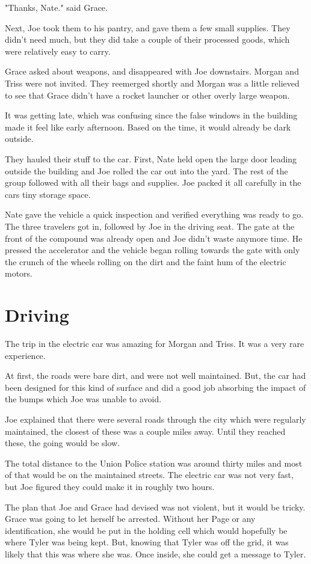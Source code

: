 \documentclass[courier]{sffms}
\begin{document}
"Thanks, Nate." said Grace.

Next, Joe took them to his pantry, and gave them
a few small supplies. They didn't need much, but
they did take a couple of their processed goods,
which were relatively easy to carry.

Grace asked about weapons, and disappeared with
Joe downstairs. Morgan and Triss were not invited.
They reemerged shortly and Morgan was a little
relieved to see that Grace didn't have a rocket
launcher or other overly large weapon.

It was getting late, which was confusing since the
false windows in the building made it feel like
early afternoon. Based on the time, it would
already be dark outside.

They hauled their stuff to the car. First, Nate held
open the large door leading outside the building
and Joe rolled the car out into the yard. The rest
of the group followed with all their bags and
supplies. Joe packed it all carefully in the cars
tiny storage space.

Nate gave the vehicle a quick inspection and
verified everything was ready to go. The three
travelers got in, followed by Joe in the driving
seat. The gate at the front of the compound
was already open and Joe didn't waste anymore
time. He pressed the accelerator and the
vehicle began rolling towards the gate with
only the crunch of the wheels rolling on the
dirt and the faint hum of the electric motors.

\chapter{Driving}
The trip in the electric car was amazing for
Morgan and Triss. It was a very rare experience.

At first, the roads were bare dirt, and were not
well maintained. But, the car had been designed
for this kind of surface and did a good job
absorbing the impact of the bumps which Joe
was unable to avoid.

Joe explained that there were several roads
through the city which were regularly maintained,
the closest of these was a couple miles away.
Until they reached these, the going would be
slow.

The total distance to the Union Police station was
around thirty miles and most of that would be on
the maintained streets. The electric car was not
very fast, but Joe figured they could make it in
roughly two hours.

The plan that Joe and Grace had devised was not
violent, but it would be tricky. Grace was going to
let herself be arrested. Without her Page or any
identification, she would be put in the holding cell
which would hopefully be where Tyler was being
kept. But, knowing that Tyler was off the grid, it
was likely that this was where she was. Once inside,
she could get a message to Tyler.
\end{document}
